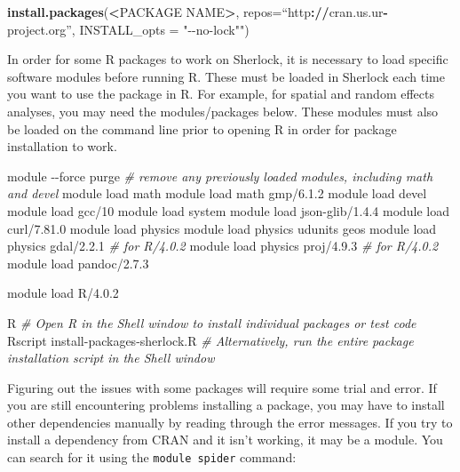 \documentclass[
]{book}
\newenvironment{Shaded}{\begin{snugshade}}{\end{snugshade}}
\newcommand{\AttributeTok}[1]{\textcolor[rgb]{0.13,0.29,0.53}{#1}}
\newcommand{\CommentTok}[1]{\textcolor[rgb]{0.56,0.35,0.01}{\textit{#1}}}
\newcommand{\ErrorTok}[1]{\textcolor[rgb]{0.64,0.00,0.00}{\textbf{#1}}}
\newcommand{\ExtensionTok}[1]{#1}
\newcommand{\FunctionTok}[1]{\textcolor[rgb]{0.13,0.29,0.53}{\textbf{#1}}}
\newcommand{\NormalTok}[1]{#1}
\newcommand{\SpecialCharTok}[1]{\textcolor[rgb]{0.81,0.36,0.00}{\textbf{#1}}}
\newcommand{\StringTok}[1]{\textcolor[rgb]{0.31,0.60,0.02}{#1}}
\begin{document}
\begin{Shaded}
\begin{Highlighting}[]
\FunctionTok{install.packages}\NormalTok{(}\SpecialCharTok{\textless{}}\NormalTok{PACKAGE NAME}\SpecialCharTok{\textgreater{}}\NormalTok{, }\AttributeTok{repos=}\NormalTok{“http}\SpecialCharTok{:}\ErrorTok{//}\NormalTok{cran.us.ur}\SpecialCharTok{{-}}\NormalTok{project.org”, }
                  \AttributeTok{INSTALL\_opts =} \StringTok{"{-}{-}no{-}lock"")}
\end{Highlighting}
\end{Shaded}

In order for some R packages to work on Sherlock, it is necessary to load specific software modules before running R. These must be loaded in Sherlock each time you want to use the package in R. For example, for spatial and random effects analyses, you may need the modules/packages below. These modules must also be loaded on the command line prior to opening R in order for package installation to work.

\begin{Shaded}
\begin{Highlighting}[]
\ExtensionTok{module} \AttributeTok{{-}{-}force}\NormalTok{ purge }\CommentTok{\# remove any previously loaded modules, including math and devel}
\ExtensionTok{module}\NormalTok{ load math}
\ExtensionTok{module}\NormalTok{ load math gmp/6.1.2}
\ExtensionTok{module}\NormalTok{ load devel}
\ExtensionTok{module}\NormalTok{ load gcc/10}
\ExtensionTok{module}\NormalTok{ load system}
\ExtensionTok{module}\NormalTok{ load json{-}glib/1.4.4}
\ExtensionTok{module}\NormalTok{ load curl/7.81.0}
\ExtensionTok{module}\NormalTok{ load physics}
\ExtensionTok{module}\NormalTok{ load physics udunits geos}
\ExtensionTok{module}\NormalTok{ load physics gdal/2.2.1 }\CommentTok{\# for R/4.0.2}
\ExtensionTok{module}\NormalTok{ load physics proj/4.9.3 }\CommentTok{\# for R/4.0.2}
\ExtensionTok{module}\NormalTok{ load pandoc/2.7.3}

\ExtensionTok{module}\NormalTok{ load R/4.0.2}

\ExtensionTok{R} \CommentTok{\# Open R in the Shell window to install individual packages or test code}
\ExtensionTok{Rscript}\NormalTok{ install{-}packages{-}sherlock.R }\CommentTok{\# Alternatively, run the entire package installation script in the Shell window}
\end{Highlighting}
\end{Shaded}

Figuring out the issues with some packages will require some trial and error. If you are still encountering problems installing a package, you may have to install other dependencies manually by reading through the error messages. If you try to install a dependency from CRAN and it isn't working, it may be a module. You can search for it using the \texttt{module\ spider} command:
\end{document}
